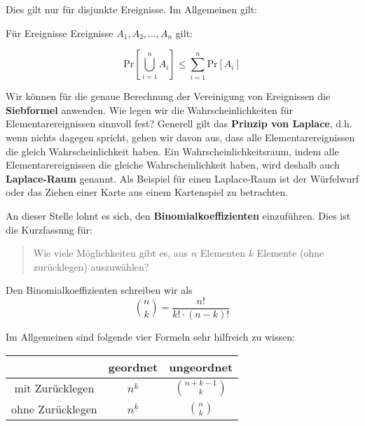 Dies gilt nur für disjunkte Ereignisse. Im Allgemeinen gilt:

\begin{satz}
    Für Ereignisse Ereignisse $A_1, A_2, ... , A_n$ gilt:

    $$\text{Pr}[ \bigcup_{i=1}^{n} A_i] \leq \sum_{i = 1}^{n} \text{Pr}[A_i]$$
\end{satz}
\bigskip

Wir können für die genaue Berechnung der Vereinigung von Ereignissen die \textbf{Siebformel} anwenden.
Wie legen wir die Wahrscheinlichkeiten für Elementarereignissen sinnvoll fest? Generell gilt das
\textbf{Prinzip von Laplace}, d.h. wenn nichts dagegen spricht, gehen wir davon aus, dass alle 
Elementarereignissen die gleich Wahrscheinlichkeit haben. Ein Wahrscheinlichkeitsraum, indem alle
Elementarereignissen die gleiche Wahrscheinlichkeit haben, wird deshalb auch \textbf{Laplace-Raum}
genannt. Als Beispiel für einen Laplace-Raum ist der Würfelwurf oder das Ziehen einer Karte aus einem
Kartenspiel zu betrachten.


An dieser Stelle lohnt es sich, den \textbf{Binomialkoeffizienten} einzuführen. Dies ist die Kurzfassung
für: 

\begin{quote}
    Wie viele Möglichkeiten gibt es, aus $n$ Elementen $k$ Elemente (ohne zurücklegen) auszuwählen?
\end{quote}

Den Binomialkoeffizienten schreiben wir als 
$$\binom{n}{k} = \frac{n!}{k! \cdot (n-k)!}$$

Im Allgemeinen sind folgende vier Formeln sehr hilfreich zu wissen:

\begin{center}
    \begin{tabular}[h]{c || c | c }
        & geordnet & ungeordnet \\
       \hline
       \hline
       mit Zurücklegen & $n^k$ & $\binom{n + k - 1}{k}$  \\
       \hline
       ohne Zurücklegen & $n^{\underline{k}}$ & $\binom{n}{k}$ \\
       \hline
   \end{tabular}
\end{center}
